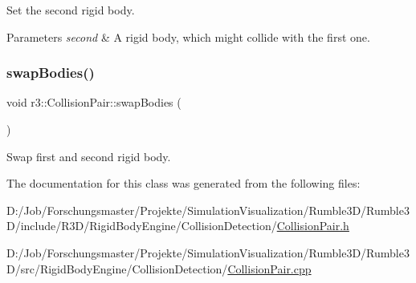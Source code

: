 Set the second rigid body. 


\begin{DoxyParams}{Parameters}
{\em second} & A rigid body, which might collide with the first one. \\
\hline
\end{DoxyParams}
\mbox{\label{classr3_1_1_collision_pair_a8ef5b5bae7be7db3ed2574ecd9e5bf9a}} 
\subsubsection{\texorpdfstring{swap\+Bodies()}{swapBodies()}}
{\footnotesize\ttfamily void r3\+::\+Collision\+Pair\+::swap\+Bodies (\begin{DoxyParamCaption}{ }\end{DoxyParamCaption})}



Swap first and second rigid body. 



The documentation for this class was generated from the following files\+:\begin{DoxyCompactItemize}
\item 
D\+:/\+Job/\+Forschungsmaster/\+Projekte/\+Simulation\+Visualization/\+Rumble3\+D/\+Rumble3\+D/include/\+R3\+D/\+Rigid\+Body\+Engine/\+Collision\+Detection/\mbox{\hyperlink{_collision_pair_8h}{Collision\+Pair.\+h}}\item 
D\+:/\+Job/\+Forschungsmaster/\+Projekte/\+Simulation\+Visualization/\+Rumble3\+D/\+Rumble3\+D/src/\+Rigid\+Body\+Engine/\+Collision\+Detection/\mbox{\hyperlink{_collision_pair_8cpp}{Collision\+Pair.\+cpp}}\end{DoxyCompactItemize}

